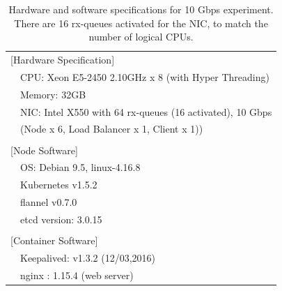 {
\setlength{\tabcolsep}{1em}
\renewcommand{\arraystretch}{1.2}

\begin{table}[h]
  \centering
  \begin{tabular}{ll}
    \hline 
    \multicolumn{2}{l}{[Hardware Specification]}   \\
    & CPU: Xeon E5-2450 2.10GHz x 8 (with Hyper Threading) \\
    & Memory: 32GB \\
    & NIC: Intel X550 with 64 rx-queues (16 activated), 10 Gbps \\
    & (Node x 6, Load Balancer x 1, Client x 1)) \\
    & \\
    \multicolumn{2}{l}{[Node Software]}  \\
    & OS: Debian 9.5, linux-4.16.8 \\
    & Kubernetes v1.5.2 \\
    & flannel v0.7.0 \\
    & etcd version: 3.0.15 \\
    & \\
    \multicolumn{2}{l}{[Container Software]}   \\
    & Keepalived: v1.3.2 (12/03,2016) \\
    & nginx : 1.15.4 (web server) \\
  \hline 
  \end{tabular}
  \par\bigskip
  \centering
  \begin{minipage}{0.9\columnwidth}
    \caption[Hardware and software specifications for 10 Gbps experiment]{
      Hardware and software specifications for 10 Gbps experiment.
      There are 16 rx-queues activated for the NIC, to match the number of logical CPUs.
    }
    \label{tab:hw_sw_spec_10g}
  \end{minipage}
\end{table}
}

